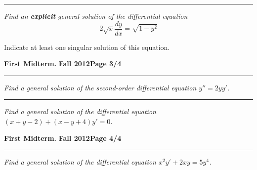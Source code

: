 \documentclass[12pt]{article}
\begin{document}
\vspace{2.5cm}
\begin{flushright}
\end{flushright}
\hrule

{\problem[15 pts] \em Find an {\bf explicit} general solution of the differential
  equation}
\begin{equation*}
2\sqrt{x} \frac{dy}{dx} = \sqrt{1-y^2}
\end{equation*}
\vspace{3.5cm}
\begin{flushright}
\end{flushright}
Indicate at least one singular solution of this equation.
\begin{flushright}
\end{flushright}
\newpage

\hfill{\large\bf First Midterm.}\hfill{\large\bf
  Fall 2012}\hfill{\large\bf Page 3/4}\hrule

\bigskip
{\problem[20 pts] \em Find a general solution of the second-order
  differential equation $y''=2yy'$.}
\vspace{8.5cm}
\begin{flushright}
\end{flushright}
\hrule
{\problem[20 pts] \em Find a general solution of the differential
  equation $(x+y-2) + (x-y+4) y' = 0$.}
\vspace{8.5cm}
\begin{flushright}
\end{flushright}
\newpage

\hfill{\large\bf First Midterm.}\hfill{\large\bf
  Fall 2012}\hfill{\large\bf Page 4/4}\hrule

\bigskip
{\problem[25 pts] \em Find a general solution of the differential
  equation $x^2y'+2xy=5y^4$.}
\vspace{20cm}
\begin{flushright}
\end{flushright}
\end{document}
